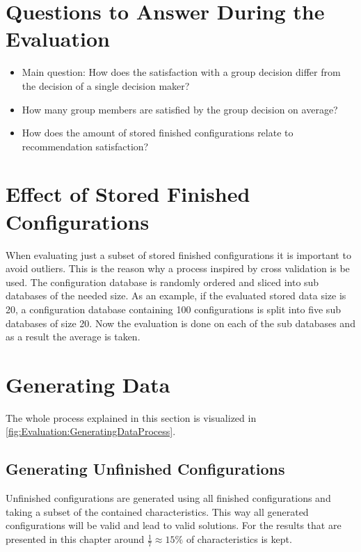 \section{Questions to Answer During the Evaluation}
\label{sec:Evaluation:Questions}

\begin{itemize}
    \item Main question: How does the satisfaction with a group decision differ from the decision of a single decision maker?
    \item How many group members are satisfied by the group decision on average?
    \item How does the amount of stored finished configurations relate to recommendation satisfaction?
\end{itemize}

\section{Effect of Stored Finished Configurations}
\label{sec:Evaluation:EffectFinishedConfiguration}

When evaluating just a subset of stored finished configurations it is important to avoid outliers. This is the reason why a process inspired by cross validation is be used. The configuration database is randomly ordered and sliced into sub databases of the needed size. As an example, if the evaluated stored data size is 20, a configuration database containing 100 configurations is split into five sub databases of size 20. Now the evaluation is done on each of the sub databases and as a result the average is taken.


\section{Generating Data}
\label{sec:Evaluation:GeneratingGroups}

The whole process explained in this section is visualized in \autoref{fig:Evaluation:GeneratingDataProcess}.

\subsection{Generating Unfinished Configurations}

Unfinished configurations are generated using all finished configurations and taking a subset of the contained characteristics. This way all generated configurations will be valid and lead to valid solutions. For the results that are presented in this chapter around $\frac{1}{7} \approx 15\%$ of characteristics is kept.

